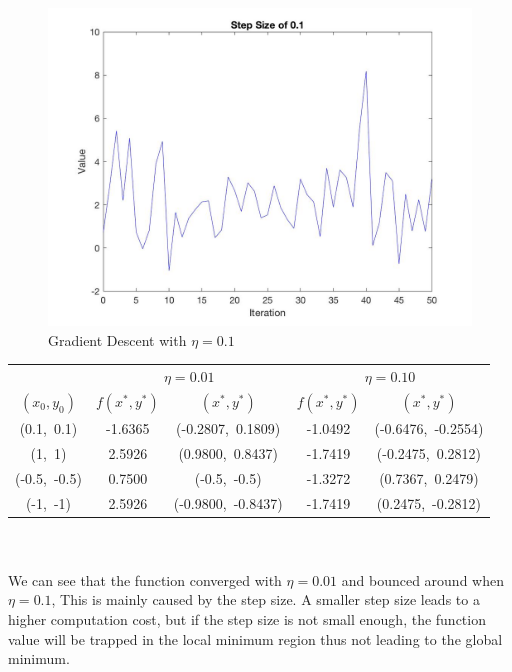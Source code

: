 \documentclass[12pt]{article}
\begin{document}
\begin{figure}[H]
  \centering
  \includegraphics[scale = 0.3]{Pic6.jpg}
  \caption{Gradient Descent with $\eta = 0.1$}
  \label{fig:Pic6}
\end{figure}
\begin{table}[H]
 	\label{Table: minimum values}
 	\centering
 	\begin{tabular}{c|c|c|c|c}
 		\hline
 		\text{Initial points} & \multicolumn{2}{c}{$\eta=0.01$} & \multicolumn{2}{c}{$\eta=0.10$}\\
 		\cline{2-5}
 		$(x_0,y_0)$ & $f(x^*,y^*)$ & $(x^*,y^*)$ & $f(x^*,y^*)$ & $(x^*,y^*)$ \\
 		\hline
 		(0.1,\ 0.1) & -1.6365 & (-0.2807,\ 0.1809) & -1.0492 & (-0.6476,\ -0.2554) \\
 		\hline
 		(1,\ 1) & 2.5926 & (0.9800,\ 0.8437) & -1.7419 & (-0.2475,\ 0.2812)  \\
 		\hline
 		(-0.5,\ -0.5) & 0.7500 & (-0.5,\ -0.5) & -1.3272 & (0.7367,\ 0.2479)  \\
 		\hline
 		(-1,\ -1) & 2.5926 & (-0.9800,\ -0.8437) & -1.7419 & (0.2475,\ -0.2812) \\
 		\hline
 	\end{tabular}\vspace{-3mm}
\end{table}\indent \\
\\We can see that the function converged with $\eta = 0.01$ and bounced around when $\eta = 0.1$, This is mainly caused by the step size. A smaller step size leads to a higher computation cost, but if the step size is not small enough, the function value will be trapped in the local minimum region thus not leading to the global minimum.\\\\
\end{document}
